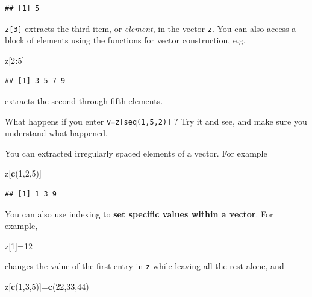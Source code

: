\documentclass[11pt,]{article}
\newenvironment{Shaded}{\begin{snugshade}}{\end{snugshade}}
\newcommand{\DecValTok}[1]{\textcolor[rgb]{0.00,0.00,0.81}{#1}}
\newcommand{\KeywordTok}[1]{\textcolor[rgb]{0.13,0.29,0.53}{\textbf{#1}}}
\newcommand{\NormalTok}[1]{#1}
\newcommand{\OperatorTok}[1]{\textcolor[rgb]{0.81,0.36,0.00}{\textbf{#1}}}
\begin{document}
\begin{verbatim}
## [1] 5
\end{verbatim}

\texttt{z{[}3{]}} extracts the third item, or \emph{element}, in the vector \texttt{z}.
You can also access a block of elements using the functions for
vector construction, e.g.

\begin{Shaded}
\begin{Highlighting}[]
\NormalTok{z[}\DecValTok{2}\OperatorTok{:}\DecValTok{5}\NormalTok{]}
\end{Highlighting}
\end{Shaded}

\begin{verbatim}
## [1] 3 5 7 9
\end{verbatim}

extracts the second through fifth elements.

What happens if you enter \texttt{v=z{[}seq(1,5,2){]}} ? Try it and see, and make sure you understand what happened.

You can extracted irregularly spaced elements of a vector. For example

\begin{Shaded}
\begin{Highlighting}[]
\NormalTok{z[}\KeywordTok{c}\NormalTok{(}\DecValTok{1}\NormalTok{,}\DecValTok{2}\NormalTok{,}\DecValTok{5}\NormalTok{)]}
\end{Highlighting}
\end{Shaded}

\begin{verbatim}
## [1] 1 3 9
\end{verbatim}

You can also use indexing to \textbf{set specific values within a vector}. For
example,

\begin{Shaded}
\begin{Highlighting}[]
\NormalTok{z[}\DecValTok{1}\NormalTok{]=}\DecValTok{12}
\end{Highlighting}
\end{Shaded}

changes the value of the first entry in \texttt{z} while leaving all the rest alone, and

\begin{Shaded}
\begin{Highlighting}[]
\NormalTok{z[}\KeywordTok{c}\NormalTok{(}\DecValTok{1}\NormalTok{,}\DecValTok{3}\NormalTok{,}\DecValTok{5}\NormalTok{)]=}\KeywordTok{c}\NormalTok{(}\DecValTok{22}\NormalTok{,}\DecValTok{33}\NormalTok{,}\DecValTok{44}\NormalTok{)}
\end{Highlighting}
\end{Shaded}
\end{document}
